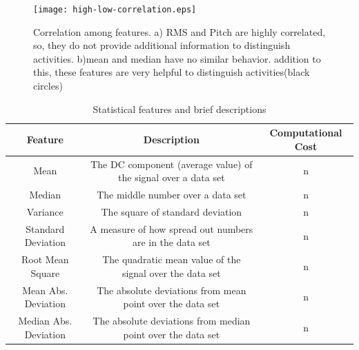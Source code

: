 \begin{figure}
\texttt{[image: high-low-correlation.eps]}
\caption{Correlation among features. a) RMS and Pitch are highly correlated, so, they do not provide additional information to distinguish activities. b)mean and median have no similar behavior. addition to this, these features are very helpful to distinguish activities(black circles)}
\label{feature_correlation}
\end{figure}
\begin{table}
  \caption{Statistical features and brief descriptions}
  \label{feature_list}
  \begin{tabular}{ | c | c | c | }
    \hline
    Feature&Description&Computational Cost\\
    \hline
    Mean &  The DC component (average value) of the signal over a data set & n\\
    \hline
    Median & The middle number over a data set & n\\
    \hline
    Variance & The square of standard deviation & n\\
    \hline
    Standard Deviation & A measure of how spread out numbers are in the data set & n\\
    \hline
    Root Mean Square & The quadratic mean value of the signal over the data set & n\\
    \hline
    Mean Abs. Deviation & The absolute deviations from mean point over the data set & n\\
    \hline
    Median Abs. Deviation & The absolute deviations from median point over the data set & n\\
  \hline
\end{tabular}
\end{table}

